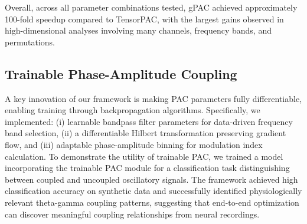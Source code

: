 Overall, across all parameter combinations tested, gPAC achieved approximately 100-fold speedup compared to TensorPAC, with the largest gains observed in high-dimensional analyses involving many channels, frequency bands, and permutations.

\subsection{Trainable Phase-Amplitude Coupling}
A key innovation of our framework is making PAC parameters fully differentiable, enabling training through backpropagation algorithms. Specifically, we implemented: (i) learnable bandpass filter parameters for data-driven frequency band selection, (ii) a differentiable Hilbert transformation preserving gradient flow, and (iii) adaptable phase-amplitude binning for modulation index calculation. To demonstrate the utility of trainable PAC, we trained a model incorporating the trainable PAC module for a classification task distinguishing between coupled and uncoupled oscillatory signals. The framework achieved high classification accuracy on synthetic data and successfully identified physiologically relevant theta-gamma coupling patterns, suggesting that end-to-end optimization can discover meaningful coupling relationships from neural recordings.

